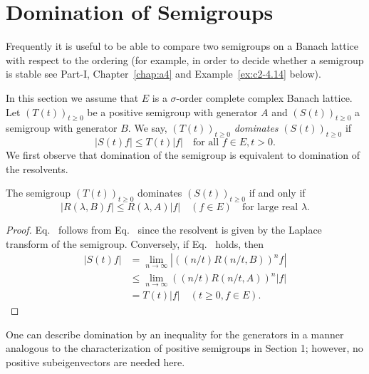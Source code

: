 \section{Domination of Semigroups} \label{sec:c2-4}
Frequently it is useful to be able to compare two semigroups on a
Banach lattice with respect to the ordering (for example, in order to
decide whether a semigroup is stable see Part-I, Chapter~\ref{chap:a4} and 
Example~\ref{ex:c2-4.14} below).

In this section we assume that $E$ is a $\sigma$-order complete complex Banach lattice. 
Let $(T(t))_{t \geq 0}$ be a positive semigroup with generator $A$ and $(S(t))_{t \geq 0}$ a semigroup with generator $B$. 
We say, $(T(t))_{t \geq 0}$ \emph{dominates} $(S(t))_{t \geq 0}$ if
\begin{equation}\label{eq:c2-4.1}
|S(t)f| \leq T(t)|f| \quad \text{for all } f \in E, t > 0.
\end{equation}
We first observe that domination of the semigroup is equivalent to domination of the resolvents.
\begin{proposition}\label{prop:c2-4.1}
The semigroup $(T(t))_{t \geq 0}$ dominates $(S(t))_{t \geq 0}$ if and only if
\begin{equation}\label{eq:c2-4.2}
|R(\lambda,B)f| \leq R(\lambda,A)|f| \quad (f \in E) \quad \text{for large real }  \lambda.
\end{equation}
\end{proposition}
\begin{proof}
Eq.~ follows from Eq.~ since the resolvent is given by the Laplace transform of the semigroup. 
Conversely, if Eq.~ holds, then
\begin{align*}
|S(t)f| &= \lim_{n \to \infty} |((n/t)R(n/t,B))^{n}f|\\
&\leq \lim_{n \to \infty} ((n/t)R(n/t,A))^{n}|f|\\
&= T(t)|f| \quad (t \geq 0, f \in E).
\end{align*}
\phantom{x}
\end{proof}
One can describe domination by an inequality for the generators in a manner analogous to the characterization of positive semigroups in Section 1; however, no positive subeigenvectors are needed here.

